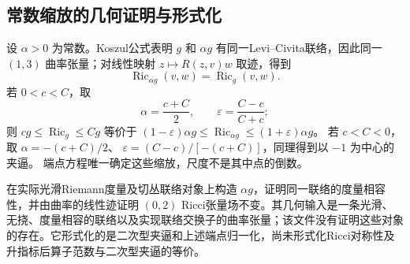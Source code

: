 \documentclass[UTF8,a4paper,11pt,fontset=fandol]{ctexart}
\numberwithin{equation}{section}
\theoremstyle{definition}
\newcommand{\Ric}{\operatorname{Ric}}
\begin{document}
\subsection{常数缩放的几何证明与形式化}
设 $\alpha>0$ 为常数。Koszul公式表明 $g$ 和 $\alpha g$ 有同一Levi--Civita联络，因此同一 $(1,3)$ 曲率张量；对线性映射
$z\mapsto R(z,v)w$ 取迹，得到
\[
\Ric_{\alpha g}(v,w)=\Ric_g(v,w).
\]
若 $0<c<C$，取
\[
\alpha=\frac{c+C}{2},\qquad \varepsilon=\frac{C-c}{C+c};
\]
则 $cg\le\Ric_g\le Cg$ 等价于
$(1-\varepsilon)\alpha g\le\Ric_{\alpha g}\le(1+\varepsilon)\alpha g$。
若 $c<C<0$，取
$\alpha=-(c+C)/2$、
$\varepsilon=(C-c)/[-(c+C)]$，同理得到以 $-1$ 为中心的夹逼。
端点方程唯一确定这些缩放，尺度不是其中点的倒数。

在实际光滑Riemann度量及切丛联络对象上构造 $\alpha g$，证明同一联络的度量相容性，并由曲率的线性迹证明 $(0,2)$ Ricci张量场不变。其几何输入是一条光滑、无挠、度量相容的联络以及实现联络交换子的曲率张量；该文件没有证明这些对象的存在。它形式化的是二次型夹逼和上述端点归一化，尚未形式化Ricci对称性及升指标后算子范数与二次型夹逼的等价。
\end{document}

